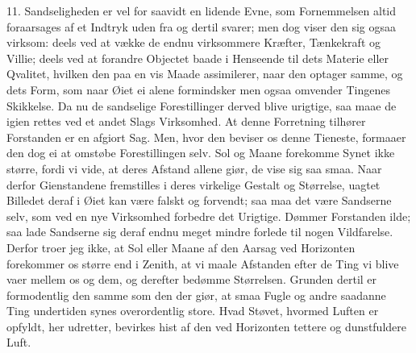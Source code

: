 \documentclass[12pt,a4paper]{article}
\newcommand{\opage}[1]{\marginnote{\footnotesize\textit{[#1]}}}
\begin{document}
11. Sandseligheden er vel for saavidt en lidende Evne, som Fornemmelsen altid
foraarsages af et Indtryk uden fra og dertil svarer; men dog viser den sig ogsaa
virksom: deels ved at vække de endnu virksommere
\opage{78} Kræfter, Tænkekraft og Villie; deels ved at forandre Objectet baade i Henseende til
dets Materie eller Qvalitet, hvilken den paa en vis Maade assimilerer, naar den optager
samme, og dets Form, som naar Øiet ei alene formindsker men ogsaa omvender Tingenes
Skikkelse. Da nu de sandselige Forestillinger derved blive urigtige, saa maae de igien
rettes ved et andet Slags Virksomhed. At denne Forretning tilhører Forstanden er en
afgiort Sag. Men, hvor den beviser os denne Tieneste, formaaer den dog ei at omstøbe
Forestillingen selv. Sol og Maane forekomme Synet ikke større, fordi vi vide, at deres
Afstand allene giør, de vise sig saa smaa. Naar derfor Gienstandene fremstilles i deres
virkelige Gestalt og Størrelse, uagtet Billedet deraf i Øiet kan være falskt og
forvendt; saa maa det være Sandserne selv, som ved en nye Virksomhed forbedre det
Urigtige. Dømmer Forstanden ilde; saa lade Sandserne sig deraf endnu meget mindre
forlede til nogen Vildfarelse. Derfor troer jeg ikke, at Sol eller Maane af den Aarsag
ved Horizonten forekommer os større end i Zenith, at vi maale Afstanden efter de Ting
vi blive vaer mellem os og dem, og derefter bedømme Størrelsen. Grunden dertil er
formodentlig den samme som den der giør, at smaa Fugle og andre saadanne Ting
undertiden synes overordentlig store. Hvad Støvet, hvormed Luften er opfyldt, her
udretter, bevirkes hist af den ved Horizonten tettere og dunstfuldere Luft.
\end{document}
